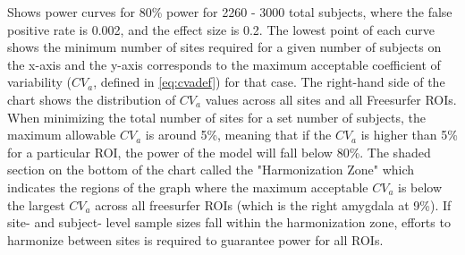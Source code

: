 \label{fig:cv_j} Shows power curves for 80\% power for 2260 - 3000 total subjects, where the false positive rate is 0.002, and the effect size is 0.2. The lowest point of each curve shows the minimum number of sites required for a given number of subjects on the x-axis and the y-axis corresponds to the maximum acceptable coefficient of variability ($CV_{a}$, defined in \ref{eq:cvadef}) for that case. The right-hand side of the chart shows the distribution of $CV_{a}$ values across all sites and all Freesurfer ROIs. When minimizing the total number of sites for a set number of subjects, the maximum allowable $CV_{a}$ is around 5\%, meaning that if the $CV_{a}$ is higher than 5\% for a particular ROI, the power of the model will fall below 80\%. The shaded section on the bottom of the chart called the "Harmonization Zone" which indicates the regions of the graph where the maximum acceptable $CV_{a}$ is below the largest $CV_{a}$ across all freesurfer ROIs (which is the right amygdala at 9\%). If site- and subject- level sample sizes fall within the harmonization zone, efforts to harmonize between sites is required to guarantee power for all ROIs.